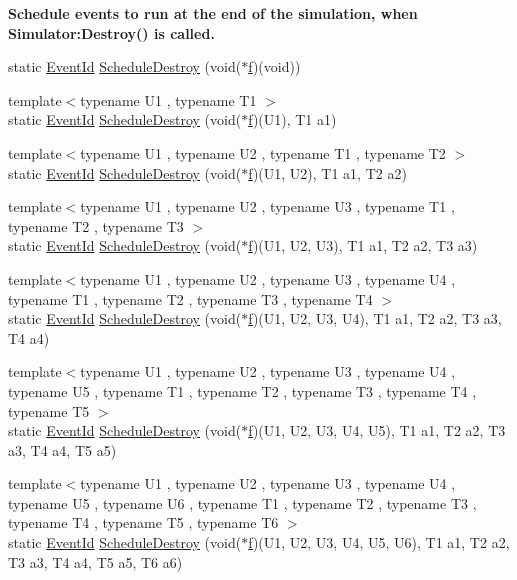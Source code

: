 \begin{Indent}{\bf Schedule events to run at the end of the simulation, when Simulator\+:Destroy() is called.}
\begin{DoxyCompactItemize}
\item 
static \hyperlink{classns3_1_1EventId}{Event\+Id} \hyperlink{classns3_1_1Simulator_a594781f851d9d1ca577b3a438df186a9}{Schedule\+Destroy} (void($\ast$\hyperlink{80211b_8c_ae7ffc1a8f84fa47a0812b2f2b9627132}{f})(void))
\item 
{\footnotesize template$<$typename U1 , typename T1 $>$ }\\static \hyperlink{classns3_1_1EventId}{Event\+Id} \hyperlink{classns3_1_1Simulator_ae98b46ec5cb232365e6a5fa036f23b07}{Schedule\+Destroy} (void($\ast$\hyperlink{80211b_8c_ae7ffc1a8f84fa47a0812b2f2b9627132}{f})(U1), T1 a1)
\item 
{\footnotesize template$<$typename U1 , typename U2 , typename T1 , typename T2 $>$ }\\static \hyperlink{classns3_1_1EventId}{Event\+Id} \hyperlink{classns3_1_1Simulator_a44be229e0287a44138a34ea98db1bf05}{Schedule\+Destroy} (void($\ast$\hyperlink{80211b_8c_ae7ffc1a8f84fa47a0812b2f2b9627132}{f})(U1, U2), T1 a1, T2 a2)
\item 
{\footnotesize template$<$typename U1 , typename U2 , typename U3 , typename T1 , typename T2 , typename T3 $>$ }\\static \hyperlink{classns3_1_1EventId}{Event\+Id} \hyperlink{classns3_1_1Simulator_a0ccfd41a454809d6f96f96d192866f2d}{Schedule\+Destroy} (void($\ast$\hyperlink{80211b_8c_ae7ffc1a8f84fa47a0812b2f2b9627132}{f})(U1, U2, U3), T1 a1, T2 a2, T3 a3)
\item 
{\footnotesize template$<$typename U1 , typename U2 , typename U3 , typename U4 , typename T1 , typename T2 , typename T3 , typename T4 $>$ }\\static \hyperlink{classns3_1_1EventId}{Event\+Id} \hyperlink{classns3_1_1Simulator_a0d2029e4df1b70875a548e6d33cabc07}{Schedule\+Destroy} (void($\ast$\hyperlink{80211b_8c_ae7ffc1a8f84fa47a0812b2f2b9627132}{f})(U1, U2, U3, U4), T1 a1, T2 a2, T3 a3, T4 a4)
\item 
{\footnotesize template$<$typename U1 , typename U2 , typename U3 , typename U4 , typename U5 , typename T1 , typename T2 , typename T3 , typename T4 , typename T5 $>$ }\\static \hyperlink{classns3_1_1EventId}{Event\+Id} \hyperlink{classns3_1_1Simulator_a309d60317db08b2fbe5e091e7058ff95}{Schedule\+Destroy} (void($\ast$\hyperlink{80211b_8c_ae7ffc1a8f84fa47a0812b2f2b9627132}{f})(U1, U2, U3, U4, U5), T1 a1, T2 a2, T3 a3, T4 a4, T5 a5)
\item 
{\footnotesize template$<$typename U1 , typename U2 , typename U3 , typename U4 , typename U5 , typename U6 , typename T1 , typename T2 , typename T3 , typename T4 , typename T5 , typename T6 $>$ }\\static \hyperlink{classns3_1_1EventId}{Event\+Id} \hyperlink{classns3_1_1Simulator_a4dee132ff2c5f7ced2e2cf701eafe3ad}{Schedule\+Destroy} (void($\ast$\hyperlink{80211b_8c_ae7ffc1a8f84fa47a0812b2f2b9627132}{f})(U1, U2, U3, U4, U5, U6), T1 a1, T2 a2, T3 a3, T4 a4, T5 a5, T6 a6)
\end{DoxyCompactItemize}
\end{Indent}
